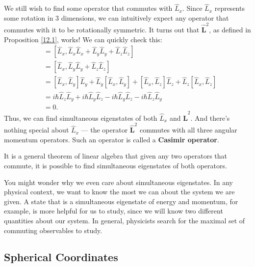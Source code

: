 We still wish to find some operator that commutes with $\hat{L}_x$. Since $\hat{L}_x$ represents some rotation in 3 dimensions, we can intuitively expect any operator that commutes with it to be rotationally symmetric. It turns out that $\hat{\mathbf{L}}^2$, as defined in Proposition \ref{12.1}, works! We can quickly check this: \begin{align*}[\hat{L}_x,\hat{\mathbf{L}}^2]&=[\hat{L}_x,\hat{L}_x\hat{L}_x+\hat{L}_y\hat{L}_y+\hat{L}_z\hat{L}_z] \\ &=[\hat{L}_x,\hat{L}_y\hat{L}_y+\hat{L}_z\hat{L}_z]\\ &=[\hat{L}_x,\hat{L}_y]\hat{L}_y+\hat{L}_y[\hat{L}_x,\hat{L}_y]+[\hat{L}_x,\hat{L}_z]\hat{L}_z+\hat{L}_z[\hat{L}_x,\hat{L}_z]\\ &=i\hbar\hat{L}_z\hat{L}_y+i\hbar\hat{L}_y\hat{L}_z-i\hbar\hat{L}_y\hat{L}_z-i\hbar\hat{L}_z\hat{L}_y\\ &=0.\end{align*}Thus, we can find simultaneous eigenstates of both $\hat{L}_x$ and $\hat{\mathbf{L}}^2$. And there's nothing special about $\hat{L}_x$ --- the operator $\hat{\mathbf{L}}^2$ commutes with all three angular momentum operators. Such an operator is called a \textbf{Casimir operator}.

\begin{framedrmk*}
    It is a general theorem of linear algebra that given any two operators that commute, it is possible to find simultaneous eigenstates of both operators.
\end{framedrmk*}

\begin{framedrmk*}
    You might wonder why we even care about simultaneous eigenstates. In any physical context, we want to know the most we can about the system we are given. A state that is a simultaneous eigenstate of energy and momentum, for example, is more helpful for us to study, since we will know two different quantities about our system. In general, physicists search for the maximal set of commuting observables to study.
\end{framedrmk*}

\subsection{Spherical Coordinates}\label{spherical_coordinates}

